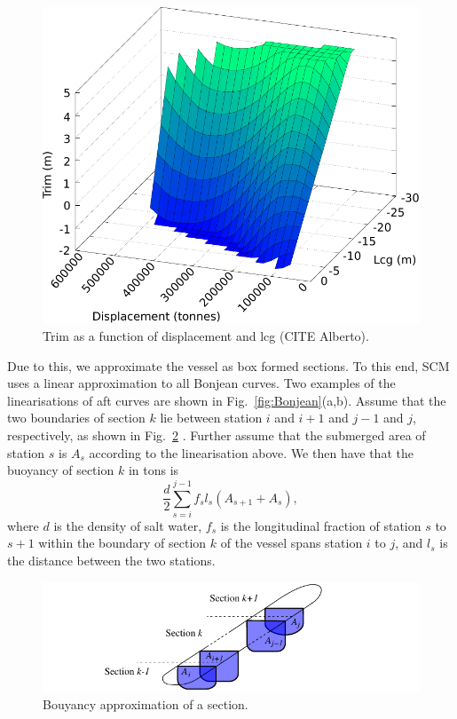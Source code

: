 \documentclass[runningheads]{llncs}
\begin{document}
\begin{figure}[h!]
\begin{center}
  \includegraphics[scale=0.5]{figures/hd_trim}
\end{center}
\caption{Trim as a function of displacement and lcg (CITE Alberto).}
\label{fig:hdtrim}
\end{figure}


Due to this, we approximate the vessel as box formed sections. To this end, SCM uses a linear approximation to all Bonjean curves. Two examples of the linearisations of aft curves are shown in Fig.~\ref{fig:Bonjean}(a,b). Assume that the two boundaries of section $k$ lie between station $i$ and $i+1$ and $j-1$ and $j$, respectively, as shown in Fig.~\ref{fig:Bapprox} . Further assume that the submerged area of station $s$ is $A_s$ according to the linearisation above. We then have that the buoyancy of section $k$ in tons is 
\begin{equation}
\frac{d}{2} \sum_{s=i}^{j-1} f_s l_s (A_{s+1} + A_{s}), \label{eq:area}    
\end{equation}
where $d$ is the density of salt water, $f_s$ is the longitudinal fraction of station $s$ to $s+1$ within the boundary of section $k$  
of the vessel spans station $i$ to $j$, and $l_s$ is the distance between the two stations.
\begin{figure}[h!]
\begin{center}
  \includegraphics[scale=1]{figures/BouyancyApprox}
\end{center}
\caption{Bouyancy approximation of a section.}
\label{fig:Bapprox}
\end{figure}
\end{document}

